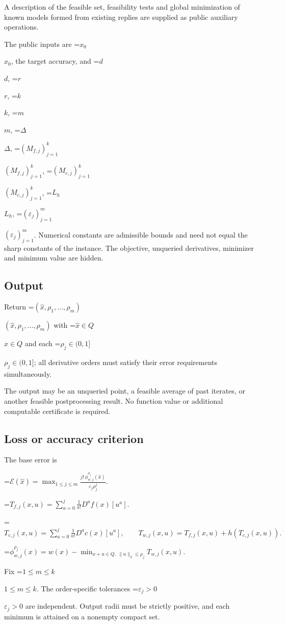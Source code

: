 \documentclass[10pt,a4paper]{article}
\newcommand{\AtlasMath}[1]{\par\begingroup\centering\setbox0=\hbox{$\displaystyle #1$}\ifdim\wd0>1.4\linewidth\typeout{ATLAS WIDE FORMULA: \the\wd0}\fi\ifdim\wd0>\linewidth\resizebox{\linewidth}{!}{\box0}\else\box0\fi\par\endgroup}
\newcommand{\AtlasInlineMath}[1]{\begingroup\setbox0=\hbox{$#1$}\ifdim\wd0>.4\linewidth\endgroup\AtlasMath{#1}\else\endgroup$#1$\fi}
\begin{document}
A description of the feasible set, feasibility tests and global minimization of known models formed from existing replies are supplied as public auxiliary operations.

The public inputs are \AtlasInlineMath{x_0}, the target accuracy, and \AtlasInlineMath{d}, \AtlasInlineMath{r}, \AtlasInlineMath{k}, \AtlasInlineMath{m}, \AtlasInlineMath{\Delta}, \AtlasInlineMath{(M_{f,j})_{j=1}^k}, \AtlasInlineMath{(M_{c,j})_{j=1}^k}, \AtlasInlineMath{L_h}, \AtlasInlineMath{(\varepsilon_j)_{j=1}^m}. Numerical constants are admissible bounds and need not equal the sharp constants of the instance. The objective, unqueried derivatives, minimizer and minimum value are hidden.

\subsection{Output}
Return \AtlasInlineMath{(\widehat{x},\rho_1,\ldots,\rho_m)} with \AtlasInlineMath{\widehat{x}\in Q} and each \AtlasInlineMath{\rho_j\in(0,1]}; all derivative orders must satisfy their error requirements simultaneously.

The output may be an unqueried point, a feasible average of past iterates, or another feasible postprocessing result. No function value or additional computable certificate is required.

\subsection{Loss or accuracy criterion}
The base error is


\AtlasMath{\mathcal{E}(\widehat{x})=\max_{1\le j\le m}\frac{j!\,\phi_{w,j}^{\rho_j}(\widehat{x})}{\varepsilon_j\rho_j^j}.}



\AtlasMath{T_{f,j}(x,u)=\sum_{a=0}^{j}\frac1{a!}D^af(x)[u^a].}



\AtlasMath{T_{c,j}(x,u)=\sum_{a=0}^{j}\frac1{a!}D^ac(x)[u^a],\qquad T_{w,j}(x,u)=T_{f,j}(x,u)+h(T_{c,j}(x,u)).}



\AtlasMath{\phi_{w,j}^{\rho_j}(x)=w(x)-\min_{x+u\in Q,\ \|u\|_2\le\rho_j}T_{w,j}(x,u).}


Fix \AtlasInlineMath{1\le m\le k}. The order-specific tolerances \AtlasInlineMath{\varepsilon_j>0} are independent. Output radii must be strictly positive, and each minimum is attained on a nonempty compact set.
\end{document}
